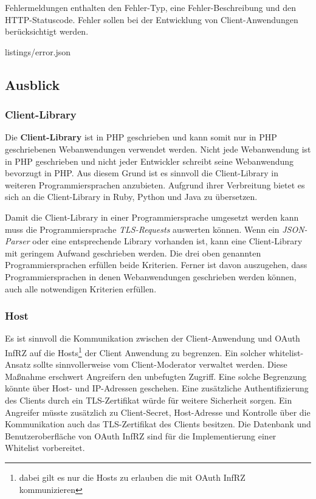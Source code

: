 \documentclass[12pt,a4paper,pointednumbers,abstracton]{scrartcl}
\begin{document}
Fehlermeldungen enthalten den Fehler-Typ, eine Fehler-Beschreibung und den HTTP-Statuscode.
Fehler sollen bei der Entwicklung von Client-Anwendungen berücksichtigt werden.

\begin{minipage}{\textwidth}
	
	{listings/error.json}
\end{minipage}

\subsection{Ausblick}

\subsubsection{Client-Library}

Die \textbf{Client-Library} ist in PHP geschrieben und kann somit nur in PHP geschriebenen Webanwendungen verwendet werden.
Nicht jede Webanwendung ist in PHP geschrieben und nicht jeder Entwickler schreibt seine Webanwendung bevorzugt in PHP.
Aus diesem Grund ist es sinnvoll die Client-Library in weiteren Programmiersprachen anzubieten.
Aufgrund ihrer Verbreitung bietet es sich an die Client-Library in Ruby, Python und Java zu übersetzen.

Damit die Client-Library in einer Programmiersprache umgesetzt werden kann muss die Programmiersprache \emph{TLS-Requests} auswerten können.
Wenn ein \emph{JSON-Parser} oder eine entsprechende Library vorhanden ist, kann eine Client-Library mit geringem Aufwand geschrieben werden.
Die drei oben genannten Programmiersprachen erfüllen beide Kriterien.
Ferner ist davon auszugehen, dass Programmiersprachen in denen Webanwendungen geschrieben werden können, auch alle notwendigen Kriterien erfüllen. 

\subsubsection{Host}
\label{sec:oauth-infrz/host}

Es ist sinnvoll die Kommunikation zwischen der Client-Anwendung und OAuth InfRZ auf die Hosts\footnote{dabei gilt es nur die Hosts zu erlauben die mit OAuth InfRZ kommunizieren} der Client Anwendung zu begrenzen.
Ein solcher whitelist-Ansatz sollte sinnvollerweise vom Client-Moderator verwaltet werden.
Diese Maßnahme erschwert Angreifern den unbefugten Zugriff.
Eine solche Begrenzung könnte über Host- und IP-Adressen geschehen.
Eine zusätzliche Authentifizierung des Clients durch ein TLS-Zertifikat würde für weitere Sicherheit sorgen.
Ein Angreifer müsste zusätzlich zu Client-Secret, Host-Adresse und Kontrolle über die Kommunikation auch das TLS-Zertifikat des Clients besitzen.
Die Datenbank und Benutzeroberfläche von OAuth InfRZ sind für die Implementierung einer Whitelist vorbereitet.
\end{document}
